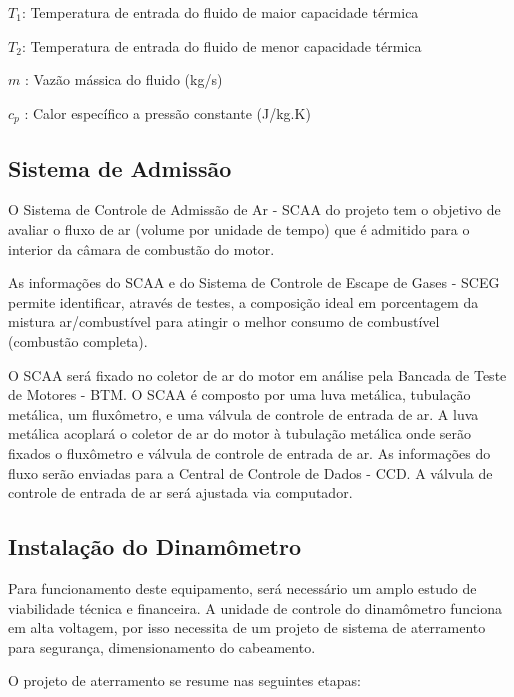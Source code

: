 $T_{1}$: Temperatura de entrada do fluido de maior capacidade térmica

$T_{2}$: Temperatura de entrada do fluido de menor capacidade térmica

$m$ : Vazão mássica do fluido (kg/s)

$c_{p}$ : Calor específico a pressão constante (J/kg.K)

\subsection{Sistema de Admissão}

O Sistema de Controle de Admissão de Ar  - SCAA do projeto tem o objetivo de avaliar o fluxo de ar (volume por unidade de tempo) que é admitido para o interior da câmara de combustão do motor. 

As informações do SCAA e do Sistema de Controle de Escape de Gases - SCEG permite identificar, através de testes, a composição ideal em porcentagem da mistura ar/combustível para atingir o melhor consumo de combustível (combustão completa). 

O SCAA será fixado no coletor de ar do motor em análise pela Bancada de Teste de Motores - BTM. O SCAA é composto por uma luva metálica, tubulação metálica, um fluxômetro, e uma válvula de controle de entrada de ar. A luva metálica acoplará o coletor de ar do motor à tubulação metálica onde serão fixados o fluxômetro e válvula de controle de entrada de ar. As informações do fluxo serão enviadas para a Central de Controle de Dados - CCD. A válvula de controle de entrada de ar será ajustada via computador.

\subsection{Instalação do Dinamômetro}

Para funcionamento deste equipamento, será necessário um amplo estudo de viabilidade técnica e financeira. A unidade de controle do dinamômetro funciona em alta voltagem, por isso necessita de um projeto de sistema de aterramento para segurança, dimensionamento do cabeamento.

O projeto de aterramento se resume nas seguintes etapas:

